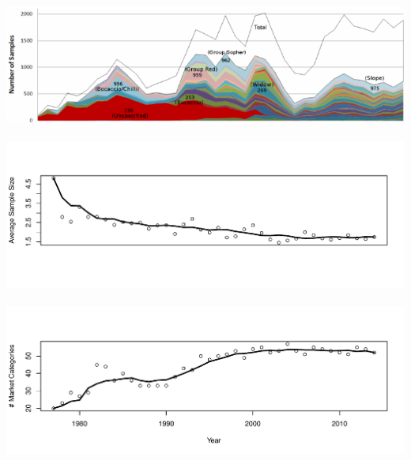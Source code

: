 \documentclass[ xcolor = pdftex, dvipsnames, table ]{beamer}
\begin{document}
\subsection{}
\begin{frame}
\centering
$~$\\
\vspace{-0.5cm}
\includegraphics[width=\textwidth]{../pictures/mcatColors.png}
$~$\\
\vspace*{-1cm}
\hspace*{-0.2cm}
\includegraphics[width=1.055\textwidth]{../pictures/stratAvgSamp.pdf}
$~$\\
\vspace*{-2.1cm}
\hspace*{-0.2cm}
\includegraphics[width=1.055\textwidth]{../pictures/nMcatsEMA.pdf}
\end{frame}

%
%

%
\end{document}
